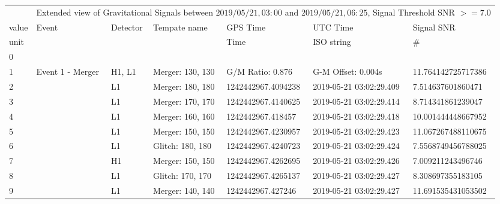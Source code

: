 \scriptsize
\setlength\LTleft{-2cm}
\begin{longtable}{lllllll}
\toprule
      &           \multicolumn{6}{l}{Extended view of Gravitational Signals between $2019/05/21, 03:00$ and $2019/05/21, 06:25$, Signal Threshold SNR $>= 7.0$} \\
value &                                             Event & Detector &      Tempate name &            GPS Time &                 UTC Time &          Signal SNR \\
unit &                                                    &          &                   &                Time &               ISO string &                  \# \\
\midrule
\endhead
0    &                                                    &          &                   &                     &                          &                     \\
1    &                                   Event 1 - Merger &   H1, L1 &  Merger: 130, 130 &    G/M Ratio: 0.876 &       G-M Offset: 0.004s &  11.764142725717386 \\
2    &                                                    &       L1 &  Merger: 180, 180 &  1242442967.4094238 &  2019-05-21 03:02:29.409 &   7.514637601860471 \\
3    &                                                    &       L1 &  Merger: 170, 170 &  1242442967.4140625 &  2019-05-21 03:02:29.414 &   8.714341861239047 \\
4    &                                                    &       L1 &  Merger: 160, 160 &   1242442967.418457 &  2019-05-21 03:02:29.418 &  10.001444448667952 \\
5    &                                                    &       L1 &  Merger: 150, 150 &  1242442967.4230957 &  2019-05-21 03:02:29.423 &  11.067267488110675 \\
6    &                                                    &       L1 &  Glitch: 180, 180 &  1242442967.4240723 &  2019-05-21 03:02:29.424 &  7.5568749456788025 \\
7    &                                                    &       H1 &  Merger: 150, 150 &  1242442967.4262695 &  2019-05-21 03:02:29.426 &   7.009211243496746 \\
8    &                                                    &       L1 &  Glitch: 170, 170 &  1242442967.4265137 &  2019-05-21 03:02:29.427 &   8.308697355183105 \\
9    &                                                    &       L1 &  Merger: 140, 140 &   1242442967.427246 &  2019-05-21 03:02:29.427 &  11.691535431053502 \\

\end{longtable}
